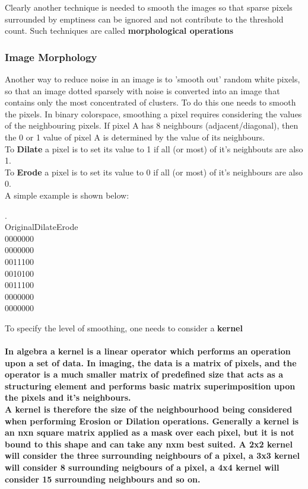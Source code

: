 Clearly another technique is needed to smooth the images so that sparse pixels surrounded by emptiness can be ignored and not contribute to the threshold count. Such techniques are called {\bf morphological operations}

\subsubsection{Image Morphology}
Another way to reduce noise in an image is to 'smooth out' random white pixels, so that an image dotted sparsely with noise is converted into an image that contains only the most concentrated of clusters.  To do this one needs to smooth the pixels.
In binary colorspace, smoothing a pixel requires considering the values of the neighbouring pixels. If pixel A has 8 neighbours (adjacent/diagonal), then the 0 or 1 value of pixel A is determined by the value of its neighbours.\\
To {\bf Dilate} a pixel is to set its value to 1 if all (or most) of it's neighbouts are also 1.\\
To {\bf Erode} a pixel is to set its value to 0 if all (or most) of it's neighbours are also 0.\\
A simple example is shown below:
\begin{center}
\begin{frame}
.\\
Original\tab	Dilate\tab	Erode\tab\\
\tiny{
0000000\\
0000000\\
0011100\\
0010100\\
0011100\\
0000000\\
0000000\\
}
\end{frame}
\end{center}

To specify the level of smoothing, one needs to consider a {\bf kernel}
\paragraph{In algebra a kernel is a linear operator which performs an operation upon a set of data. In imaging, the data is a matrix of pixels, and the operator is a much smaller matrix of predefined size that acts as a structuring element and performs basic matrix superimposition upon the pixels and it's neighbours. \\
A kernel is therefore the size of the neighbourhood being considered when performing Erosion or Dilation operations. Generally a kernel is an nxn square matrix applied as a mask over each pixel, but it is not bound to this shape and can take any nxm best suited.
A 2x2 kernel will consider the three surrounding neighbours of a pixel, a 3x3 kernel will consider 8 surrounding neigbours of a pixel, a 4x4 kernel will consider 15 surrounding neighbours and so on.
}
